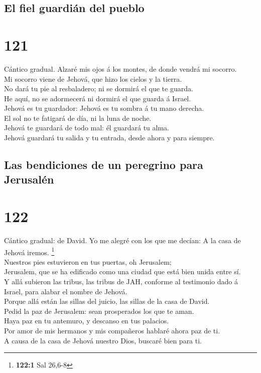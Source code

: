 \hypertarget{el-fiel-guardiuxe1n-del-pueblo}{%
\subsection{El fiel guardián del
pueblo}\label{el-fiel-guardiuxe1n-del-pueblo}}

\hypertarget{section-120}{%
\section{121}\label{section-120}}

 Cántico gradual. Alzaré mis ojos á los montes, de donde
vendrá mi socorro.\\
 Mi socorro viene de Jehová, que hizo los cielos y la
tierra.\\
 No dará tu pie al resbaladero; ni se dormirá el que te
guarda.\\
 He aquí, no se adormecerá ni dormirá el que guarda á
Israel.\\
 Jehová es tu guardador: Jehová es tu sombra á tu mano
derecha.\\
 El sol no te fatigará de día, ni la luna de noche.\\
 Jehová te guardará de todo mal: él guardará tu alma.\\
 Jehová guardará tu salida y tu entrada, desde ahora y para
siempre.

\hypertarget{las-bendiciones-de-un-peregrino-para-jerusaluxe9n}{%
\subsection{Las bendiciones de un peregrino para
Jerusalén}\label{las-bendiciones-de-un-peregrino-para-jerusaluxe9n}}

\hypertarget{section-121}{%
\section{122}\label{section-121}}

 Cántico gradual: de David. Yo me alegré con los que me
decían: A la casa de Jehová iremos. \footnote{\textbf{122:1} Sal 26,6-8}\\
 Nuestros pies estuvieron en tus puertas, oh Jerusalem;\\
 Jerusalem, que se ha edificado como una ciudad que está
bien unida entre sí.\\
 Y allá subieron las tribus, las tribus de JAH, conforme al
testimonio dado á Israel, para alabar el nombre de Jehová.\\
 Porque allá están las sillas del juicio, las sillas de la
casa de David.\\
 Pedid la paz de Jerusalem: sean prosperados los que te
aman.\\
 Haya paz en tu antemuro, y descanso en tus palacios.\\
 Por amor de mis hermanos y mis compañeros hablaré ahora paz
de ti.\\
 A causa de la casa de Jehová nuestro Dios, buscaré bien
para ti.

